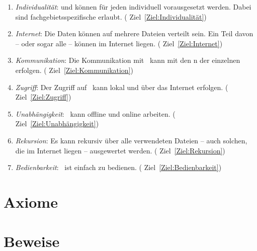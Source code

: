 \begin{enumerate}
	\item \label{Anforderung:Individualität} \emph{Individualität}:
	 und  können
	für jeden  individuell vorausgesetzt werden.
	Dabei sind fachgebietsspezifische  erlaubt.
	(\seename{} Ziel~\vref{Ziel:Individualität})

	\item \label{Anforderung:Internet} \emph{Internet}:
	Die Daten können auf mehrere Dateien verteilt sein.
	Ein Teil davon --
	oder sogar alle --
	können im Internet liegen.
	(\seename{} Ziel~\vref{Ziel:Internet})

	\item \label{Anforderung:Kommunikation} \emph{Kommunikation}:
	Die Kommunikation mit \ASBA\ kann mit den
	n der einzelnen  erfolgen.
	(\seename{} Ziel~\vref{Ziel:Kommunikation})

	\item \label{Anforderung:Zugriff} \emph{Zugriff}:
	Der Zugriff auf \ASBA\ kann lokal und über das Internet erfolgen.
	(\seename{} Ziel~\vref{Ziel:Zugriff})

	\item \label{Anforderung:Unabhängigkeit} \emph{Unabhängigkeit}:
	\ASBA\ kann offline und online arbeiten.
	(\seename{} Ziel~\vref{Ziel:Unabhängigkeit})

	\item \label{Anforderung:Rekursion} \emph{Rekursion}:
	Es kann rekursiv über alle verwendeten Dateien
	-- auch solchen, die im Internet liegen --
	ausgewertet werden.
	(\seename{} Ziel~\vref{Ziel:Rekursion})

	\item \label{Anforderung:Bedienbarkeit} \emph{Bedienbarkeit}:
	\ASBA\ ist einfach zu bedienen.
	(\seename{} Ziel~\vref{Ziel:Bedienbarkeit})

\end{enumerate}

\section{Axiome}%
\label{sec:Axiome}

\section{Beweise}%
\label{sec:Beweise}

